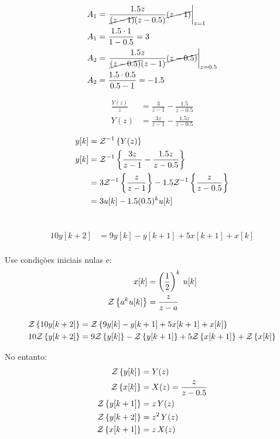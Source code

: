 \documentclass[12pt, a4paper]{article}
\begin{document}
\begin{align}
	A_1 &= \left.\frac{1.5z}{\cancel{(z-1)}(z-0.5)}\cancel{(z-1)}\right|_{z=1}\\
	A_1 &=\frac{1.5\cdot 1}{1-0.5} = 3\\
	A_2 &= \left.\frac{1.5z}{\cancel{(z-0.5)}(z-1)}\cancel{(z-0.5)}\right|_{z=0.5}\\
	A_2 &=\frac{1.5\cdot 0.5}{0.5-1} = -1.5
\end{align}
\pagebreak


\begin{align}
	\frac{Y(z)}{z} &= \frac{3}{z-1}-\frac{1.5}{z-0.5}\\
	Y(z) &= \frac{3z}{z-1}-\frac{1.5z}{z-0.5}
\end{align}

\begin{align}
	y[k]&=\mathcal{Z}^{-1}\left\{Y(z)\right\}\\
	y[k]&=\mathcal{Z}^{-1}\left\{\frac{3z}{z-1}-\frac{1.5z}{z-0.5}\right\}\\
	&= 3\mathcal{Z}^{-1}\left\{\frac{z}{z-1}\right\}-1.5\mathcal{Z}^{-1}\left\{\frac{z}{z-0.5}\right\}\\
	&= 3u[k]-1.5 (0.5)^ku[k]
\end{align}

\pagebreak
\section{ }

\begin{align}
	10y[k+2]&=9y[k]-y[k+1]+5x[k+1]+x[k]\\
\end{align}

Use condições iniciais nulas e:
\begin{align}
	x[k] &= \left(\frac{1}{2}\right)^k \,u[k]\\
	\mathcal{Z}\left\{a^ku[k]\right\} &= \frac{z}{z-a}
\end{align}

\begin{align}
	\mathcal{Z}\left\{10y[k+2]\right\}&=\mathcal{Z}\left\{9y[k]-y[k+1]+5x[k+1]+x[k]\right\}\\
	10\mathcal{Z}\left\{y[k+2]\right\}&=9\mathcal{Z}\left\{y[k]\right\}-\mathcal{Z}\left\{y[k+1]\right\}+5\mathcal{Z}\left\{x[k+1]\right\}+\mathcal{Z}\left\{x[k]\right\}\label{eq:eq transformada2}
\end{align}

No entanto:
\begin{align}
	\mathcal{Z}\left\{y[k]\right\} &= Y(z)\\
	\mathcal{Z}\left\{x[k]\right\} &= X(z) = \frac{z}{z-0.5}\\
	\mathcal{Z}\left\{y[k+1]\right\} &= z\,Y(z)\\
	\mathcal{Z}\left\{y[k+2]\right\} &= z^2\,Y(z)\\
	\mathcal{Z}\left\{x[k+1]\right\} &= z\,X(z)
\end{align}
\end{document}
